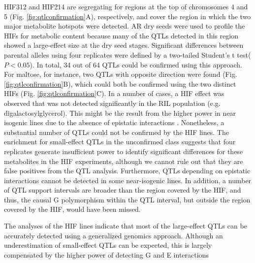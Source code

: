 HIF312 and HIF214 are segregating for regions at the top of chromosomes 4 and 5 (Fig. \ref{fig:qtlconfirmation}A), respectively,
and cover the region in which the two major metabolite hotspots were detected. AR dry seeds were used to
profile the HIFs for metabolic content because many of the QTLs detected in this region showed a 
large-effect size at the dry seed stages. Significant differences between parental alleles using four 
replicates were defined by a two-tailed Student's t test($P < 0.05$). In total, 34 out of 64 QTLs could 
be confirmed using this approach. For maltose, for instance, two QTLs with 
opposite direction were found (Fig. \ref{fig:qtlconfirmation}B), which could both be confirmed using the two distinct HIFs 
(Fig. \ref{fig:qtlconfirmation}C). In a number of cases, a HIF effect was observed that was not detected significantly
in the RIL population (e.g. digalactosylglycerol). This might be the result from the higher power in 
near isogenic lines due to the absence of epistatic interactions \cite{Keurentjes:2007a}. Nonetheless, 
a substantial number of QTLs could not be confirmed by the HIF lines. The enrichment for small-effect 
QTLs in the unconfirmed class suggests that four replicates generate insufficient power to identify 
significant differences for these metabolites in the HIF experiments, although we cannot rule out that 
they are false positives from the QTL analysis. Furthermore, QTLs depending on epistatic interactions 
cannot be detected in some near-isogenic lines. In addition, a number of QTL support intervals are 
broader than the region covered by the HIF, and thus, the causal G polymorphism within the QTL interval, 
but outside the region covered by the HIF, would have been missed.

The analyses of the HIF lines indicate that most of the large-effect QTLs can be accurately detected 
using a generalized genomics approach. Although an underestimation of small-effect QTLs can be expected, 
this is largely compensated by the higher power of detecting G and E interactions

